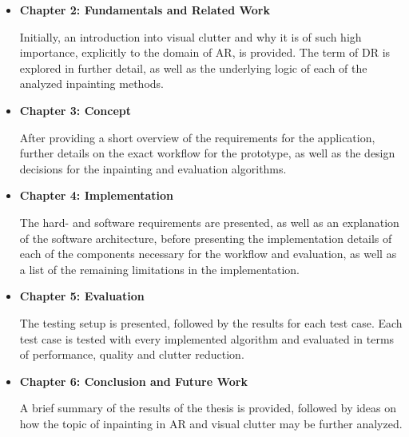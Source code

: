 \begin{itemize}
\item \textbf{Chapter 2: Fundamentals and Related Work}

Initially, an introduction into visual clutter and why it is of such high importance, explicitly to the domain of AR, is provided. The term of DR is explored in further detail, as well as the underlying logic of each of the analyzed inpainting methods.

\item \textbf{Chapter 3: Concept}

After providing a short overview of the requirements  for the application, further details on the exact workflow for the prototype, as well as the design decisions for the inpainting and evaluation algorithms.

\item \textbf{Chapter 4: Implementation}

The hard- and software requirements are presented, as well as an explanation of the software architecture, before presenting the implementation details of each of the components necessary for the workflow and evaluation, as well as a list of the remaining limitations in the implementation.

\item \textbf{Chapter 5: Evaluation}

The testing setup is presented, followed by the results for each test case. Each test case is tested with every implemented algorithm and evaluated in terms of performance, quality and clutter reduction.

\item \textbf{Chapter 6: Conclusion and Future Work}

A brief summary of the results of the thesis is provided, followed by ideas on how the topic of inpainting in AR and visual clutter may be further analyzed.
\end{itemize}
